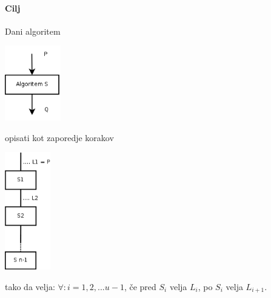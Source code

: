 \documentclass[a4paper,10pt]{article}
\begin{document}
\paragraph{Cilj}
Dani algoritem
	\begin{center}
	\includegraphics[width=2.45cm,height=3.25cm]{Slike/AlgoritemS}
	\end{center}
opisati kot zaporedje korakov
	\begin{center}
	\includegraphics[width=2cm,height=5.1cm]{Slike/ZaporedjeKorakov.png}
	\end{center}
tako da velja: $\forall : i=1, 2,... u-1$, \v ce pred $S_i$ velja $L_i$, po $S_i$ velja $L_{i+1}$.
\end{document}
